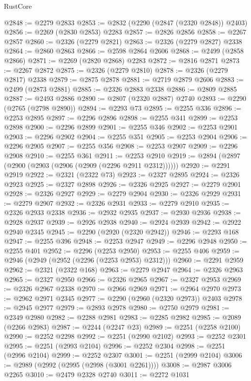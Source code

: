 \begin{lexlean}{RustCore}
\begin{coremodule}
@2848 := @2279 @2833
@2853 := @2832 (@2290 (@2847 (@2320 @2848)) @2403)
@2856 := @2269 (@2830 @2853) @2283
@2857 := @2826 @2856
@2858 := @2267 @2857
@2860 := @2326 (@2279 @2821)
@2863 := @2326 (@2279 @2827) @2338
@2864 := @2860 @2863
@2866 := @2598 @2864 @2606
@2868 := @2499 (@2858 @2866)
@2871 := @2269 (@2820 @2868) @2283
@2872 := @2816 @2871
@2873 := @2267 @2872
@2875 := @2326 (@2279 @2810)
@2878 := @2326 (@2279 @2817) @2338
@2879 := @2875 @2878
@2881 := @2719 @2879 @2606
@2883 := @2499 (@2873 @2881)
@2885 := @2326 @2883 @2338
@2886 := @2809 @2885
@2887 := @2493 @2886
@2890 := @2807 (@2320 @2887) @2740
@2893 := @2290 (@2765 (@2798 @2890))
@2894 := @2293 @73
@2895 := @2255 @336
@2896 := @2253 @2895
@2897 := @2296 @2896
@2898 := @2255 @341
@2899 := @2253 @2898
@2900 := @2296 @2899
@2901 := @2255 @346
@2902 := @2253 @2901
@2903 := @2296 @2902
@2904 := @2255 @351
@2905 := @2253 @2904
@2906 := @2296 @2905
@2907 := @2255 @356
@2908 := @2253 @2907
@2909 := @2296 @2908
@2910 := @2255 @361
@2911 := @2253 @2910
@2919 := @2894 (@2897 (@2900 (@2903 (@2906 (@2909 (@2296 @2911 @2312))))))
@2920 := @2291 @2919
@2922 := @2321 (@2322 @73)
@2923 := @2327 @2895
@2924 := @2326 @2923
@2925 := @2327 @2898
@2926 := @2326 @2925
@2927 := @2279 @2901
@2928 := @2326 @2927
@2929 := @2279 @2904
@2930 := @2326 @2929
@2931 := @2279 @2907
@2932 := @2326 @2931
@2933 := @2279 @2910
@2935 := @2326 @2933 @2338
@2936 := @2932 @2935
@2937 := @2930 @2936
@2938 := @2928 @2937
@2939 := @2926 @2938
@2940 := @2924 @2939
@2942 := @2922 @2940 @2345
@2945 := @2290 (@2920 (@2320 @2942))
@2946 := @2293 @168
@2947 := @2255 @396
@2948 := @2253 @2947
@2949 := @2296 @2948
@2950 := @2255 @401
@2952 := @2296 (@2253 @2950)
@2953 := @2255 @406
@2959 := @2946 (@2949 (@2952 (@2296 (@2253 @2953) @2312)))
@2960 := @2291 @2959
@2962 := @2321 (@2322 @168)
@2963 := @2279 @2947
@2964 := @2326 @2963
@2965 := @2327 @2950
@2966 := @2326 @2965
@2967 := @2327 @2953
@2969 := @2326 @2967 @2338
@2970 := @2966 @2969
@2971 := @2964 @2970
@2973 := @2962 @2971 @2345
@2977 := @2290 (@2960 (@2320 @2973)) @2403
@2978 := @2945 @2977
@2979 := @2893 @2978
@2980 := @2750 @2979
@2981 := @2349 @2980
@2982 := @2288 @2981
@2983 := @2285 @2982
@2985 := @2089 (@2266 @2983)
@2987 := @2244 (@2247 @23)
@2989 := @2251 (@2258 @2100)
@2990 := @2252 @2298
@2992 := @2251 (@2990 @2102)
@2993 := @2252 @2301
@2995 := @2251 (@2993 @2104)
@2996 := @2252 @2304
@2998 := @2251 (@2996 @2104)
@2999 := @2252 @2307
@3001 := @2251 (@2999 @2104)
@3006 := @2989 (@2992 (@2995 (@2998 (@3001 @2261))))
@3008 := @2987 @3006 @2265
@3010 := @2479 @2328 @2740
@3011 := @2272 @1031

\end{coremodule}
\end{lexlean}

